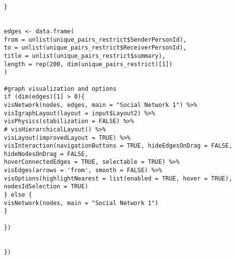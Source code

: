 \begin{verbatim}
}


edges <- data.frame(
from = unlist(unique_pairs_restrict$SenderPersonId),
to = unlist(unique_pairs_restrict$ReceiverPersonId), 
title = unlist(unique_pairs_restrict$summary),
length = rep(200, dim(unique_pairs_restrict)[1])
)

#graph visualization and options
if (dim(edges)[1] > 0){
visNetwork(nodes, edges, main = "Social Network 1") %>%
visIgraphLayout(layout = input$Layout2) %>%
visPhysics(stabilization = FALSE) %>%
# visHierarchicalLayout() %>%
visLayout(improvedLayout = TRUE) %>%
visInteraction(navigationButtons = TRUE, hideEdgesOnDrag = FALSE, hideNodesOnDrag = FALSE,
hoverConnectedEdges = TRUE, selectable = TRUE) %>%
visEdges(arrows = 'from', smooth = FALSE) %>%
visOptions(highlightNearest = list(enabled = TRUE, hover = TRUE), nodesIdSelection = TRUE)
} else {
visNetwork(nodes, main = "Social Network 1")
}

})


})

\end{verbatim}